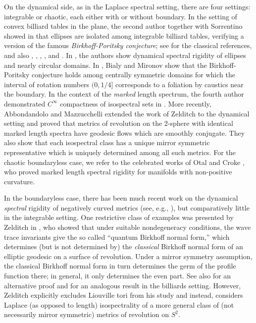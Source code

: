 \documentclass[11pt,letterpaper,oneside]{amsart}
\theoremstyle{definition}
\theoremstyle{remark}
\theoremstyle{definition}
\theoremstyle{remark}
\begin{document}
On the dynamical side, as in the Laplace spectral setting, there are four settings: integrable or chaotic, each either with or without boundary. In the setting of convex billiard tables in the plane, the second author together with Sorrentino showed in \cite{KaSo16} that ellipses are isolated among integrable billiard tables, verifying a version of the famous \emph{Birkhoff-Poritsky conjecture}; see \cite{birkhoff1927periodic, Poritsky} for the classical references, and also \cite{KaAvDS16}, \cite{koval2023local}, \cite{KovalGevrey},  \cite{KaDSWe17}, and \cite{KaSo16}. In \cite{KaDSWe17, KaSo16}, the authors show dynamical spectral rigidity of ellipses and nearly circular domains. In \cite{BialyMironov}, Bialy and Mironov show that the Birkhoff-Poritsky conjecture holds among centrally symmetric domains for which the interval of rotation numbers $(0,1/4]$ corresponds to a foliation by caustics near the boundary. In the context of the \textit{marked} length spectrum, the fourth author demonstrated $C^\infty$ compactness of isospectral sets in \cite{VigBetaCompactness}. {More recently, Abbondandolo and Mazzucchelli \cite{AbbondandoloMazzucchelli2026} extended the work of Zelditch to the dynamical setting and proved that metrics of revolution on the 2-sphere with identical marked length spectra have geodesic flows which are smoothly conjugate. They also show that each isospectral class has a unique mirror symmetric representative which is uniquely determined among all such metrics.} For the chaotic boundaryless case, we refer to the celebrated works of Otal \cite{otal1990spectre} and Croke \cite{croke1990rigidity}, who proved marked length spectral rigidity for manifolds with non-positive curvature.

\medskip

In the boundaryless case, there has been much recent work on the dynamical \emph{spectral} rigidity of negatively curved metrics (see, e.g., \cite{GuillarmouLefeuvre}), but comparatively little in the integrable setting. One restrictive class of examples was presented by Zelditch in \cite{Zelditch2}, who showed that under suitable nondegeneracy conditions, the wave trace invariants give the so called ``quantum Birkhoff normal form,'' which determines (but is not determined by) the \textit{classical} Birkhoff normal form of an elliptic geodesic on a surface of revolution. Under a mirror symmetry assumption, the classical Birkhoff normal form in turn determines the germ of the profile function there; in general, it only determines the even part. See also \cite{BruningHeintze} for an alternative proof and \cite{CdVbilliards} for an analogous result in the billiards setting. However, Zelditch explicitly excludes Liouville tori from his study and instead, considers Laplace (as opposed to length) isospectrality of a more general class of (not necessarily mirror symmetric) metrics of revolution on $S^2$. 
\end{document}
